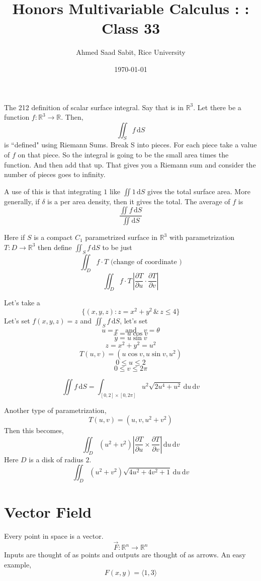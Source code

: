 \documentclass[letter]{article}
\title{Honors Multivariable Calculus : : Class 33}
\author{Ahmed Saad Sabit, Rice University}
\date{\today}
\begin{document}
\maketitle
The 212 definition of scalar surface integral. Say that is in $\mathbb{R}^{3}$. Let there be a function $f : \mathbb{R}^{3}\to \mathbb{R}$. Then, 
\[
\iint_S f \, \mathrm{d} S
\]  
is ``defined" using Riemann Sums. Break S into pieces. For each piece take a value of $f$ on that piece. So the integral is going to be the 
small area times the function. And then add that up. That gives you a Riemann sum and consider the number of pieces goes to infinity.

A use of this is that integrating $1$ like $\iint 1 \, \mathrm{d} S$ gives the total surface area. More generally, if $\delta$ is a per area density,
then it gives the total. The average of $f$ is 
\[
\frac{\iint f \, \mathrm{d} S}{ \iint \mathrm{d} S}
\] 


Here if $S$ is a compact $C_1$ parametrized surface in $\mathbb{R}^{3}$ with parametrization $T: D \to \mathbb{R}^{3}$ then define $\iint_S f \, \mathrm{d} S$ to be just 
\[
\iint_D f\cdot T \text{ (change of coordinate )} 
\]
\[
\iint_D f \cdot T \,  \left| \frac{\partial T}{\partial u} \cdot \frac{\partial T}{\partial v} \right| 
\]

Let's take a 
\[
	\{(x,y,z) : z = x^2 + y^2 \, \& \, z \le 4\} 
\]
Let's set $f(x,y,z) = z$ and $\iint_S f \, \mathrm{d} S$, let's set
\[
u = r \quad \text{and} \quad v = \theta 
\]
\[
x = u \cos v
\]
\[
y = u \sin v
\]
\[
z = x^2 + y^2 = u^2 
\]
\[
T(u,v) = ( u \cos v, u \sin v, u^2)
\]
\[
0 \le u \le 2
\]
\[
0 \le v \le 2 \pi
\]

\[
	\iint f \, \mathrm{d} S = \int_{[0,2]\times [0, 2\pi ] } 
	u^2 \sqrt{2 u ^{4} + u^2} \, \mathrm{d} u \, \mathrm{d} v 
\]

Another type of parametrization, 
\[
T(u,v) = (u,v, u^2 + v^2)
\]
Then this becomes, 
\[
\iint_D (u^2 + v^2) \left| \frac{\partial T}{\partial u} \times  \frac{\partial T}{ \partial v} \right| \, \mathrm{d} u \, \mathrm{d} v
\]
Here $D$ is a disk of radius $2$.
\[
\iint_D (u^2 + v^2) \sqrt{4 u^2 + 4 v^2 + 1}  \, \mathrm{d} u \,  \mathrm{d} v
\]

\section*{Vector Field} 
Every point in space is a vector. 
\[
\vec{F} : \mathbb{R}^{n} \to \mathbb{R}^{n} 
\] 
Inputs are thought of as points and outputs are thought of as arrows. 
An easy example, 
\[
F(x,y) = \langle 1 , 3 \rangle 
\]
\end{document}
